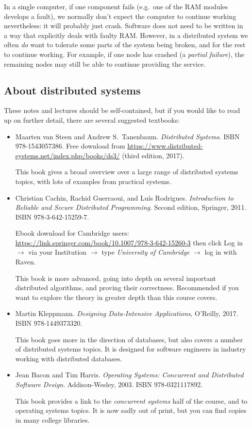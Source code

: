 In a single computer, if one component fails (e.g.\ one of the RAM modules develops a fault), we normally don't expect the computer to continue working nevertheless: it will probably just crash.
Software does not need to be written in a way that explicitly deals with faulty RAM.
However, in a distributed system we often \emph{do} want to tolerate some parts of the system being broken, and for the rest to continue working.
For example, if one node has crashed (a \emph{partial failure}), the remaining nodes may still be able to continue providing the service.

\subsection{About distributed systems}\label{sec:about}

These notes and lectures should be self-contained, but if you would like to read up on further detail, there are several suggested textbooks:
\begin{itemize}
    \item Maarten van Steen and Andrew S.\ Tanenbaum. \emph{Distributed Systems}. ISBN 978-1543057386.
        Free download from \url{https://www.distributed-systems.net/index.php/books/ds3/} (third edition, 2017).

        This book gives a broad overview over a large range of distributed systems topics, with lots of examples from practical systems.

    \item Christian Cachin, Rachid Guerraoui, and Luís Rodrigues.
        \emph{Introduction to Reliable and Secure Distributed Programming}.
        Second edition, Springer, 2011. ISBN 978-3-642-15259-7.

        Ebook download for Cambridge users: \url{https://link.springer.com/book/10.1007/978-3-642-15260-3} then click Log in $\rightarrow$ via your Institution $\rightarrow$ type \emph{University of Cambridge} $\rightarrow$ log in with Raven.

        This book is more advanced, going into depth on several important distributed algorithms, and proving their correctness.
        Recommended if you want to explore the theory in greater depth than this course covers.

    \item Martin Kleppmann. \emph{Designing Data-Intensive Applications}, O'Reilly, 2017. ISBN 978-1449373320.

        This book goes more in the direction of databases, but also covers a number of distributed systems topics.
        It is designed for software engineers in industry working with distributed databases.

    \item Jean Bacon and Tim Harris. \emph{Operating Systems: Concurrent and Distributed Software Design}.
        Addison-Wesley, 2003. ISBN 978-0321117892.

        This book provides a link to the \emph{concurrent systems} half of the course, and to operating systems topics.
        It is now sadly out of print, but you can find copies in many college libraries.
\end{itemize}

